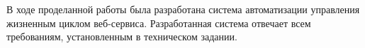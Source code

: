\Conclusion %

В ходе проделанной работы была разработана система автоматизации управления жизненным циклом веб-сервиса.
Разработанная система отвечает всем требованиям, установленным в техническом задании.



